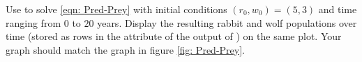 

\begin{problem}
Use  to solve \eqref{eqn: Pred-Prey} with initial conditions $(r_0, w_0) = (5, 3)$ and time ranging from $0$ to $20$ years.
Display the resulting rabbit and wolf populations over time (stored as rows in the attribute  of the output of ) on the same plot. Your graph should match the graph in figure \ref{fig: Pred-Prey}.
\end{problem}

